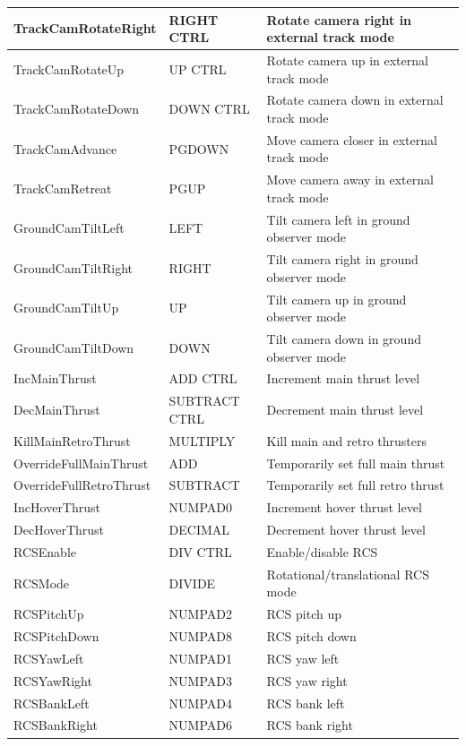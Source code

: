 \documentclass[Orbiter User Manual.tex]{subfiles}
\begin{document}
\begin{longtable}{ p{} p{} p{} }
	\hline
	TrackCamRotateRight & RIGHT CTRL & Rotate camera right in external track
		mode\\
	\hline
	TrackCamRotateUp & UP CTRL & Rotate camera up in external track mode\\
	\hline
	TrackCamRotateDown & DOWN CTRL & Rotate camera down in external track mode\\
	\hline
	TrackCamAdvance & PGDOWN & Move camera closer in external track mode\\
	\hline
	TrackCamRetreat & PGUP & Move camera away in external track mode\\
	\hline
	GroundCamTiltLeft & LEFT & Tilt camera left in ground observer mode\\
	\hline
	GroundCamTiltRight & RIGHT & Tilt camera right in ground observer mode\\
	\hline
	GroundCamTiltUp & UP & Tilt camera up in ground observer mode\\
	\hline
	GroundCamTiltDown & DOWN & Tilt camera down in ground observer mode\\
	\hline
	IncMainThrust & ADD CTRL & Increment main thrust level\\
	\hline
	DecMainThrust & SUBTRACT CTRL & Decrement main thrust level\\
	\hline
	KillMainRetroThrust & MULTIPLY & Kill main and retro thrusters\\
	\hline
	OverrideFullMainThrust & ADD & Temporarily set full main thrust\\
	\hline
	OverrideFullRetroThrust & SUBTRACT & Temporarily set full retro thrust\\
	\hline
	IncHoverThrust & NUMPAD0 & Increment hover thrust level\\
	\hline
	DecHoverThrust & DECIMAL & Decrement hover thrust level\\
	\hline
	RCSEnable & DIV CTRL & Enable/disable RCS\\
	\hline
	RCSMode & DIVIDE & Rotational/translational RCS mode\\
	\hline
	RCSPitchUp & NUMPAD2 & RCS pitch up\\
	\hline
	RCSPitchDown & NUMPAD8 & RCS pitch down\\
	\hline
	RCSYawLeft & NUMPAD1 & RCS yaw left\\
	\hline
	RCSYawRight & NUMPAD3 & RCS yaw right\\
	\hline
	RCSBankLeft & NUMPAD4 & RCS bank left\\
	\hline
	RCSBankRight & NUMPAD6 & RCS bank right\\
	\hline

\end{longtable}
\end{document}
